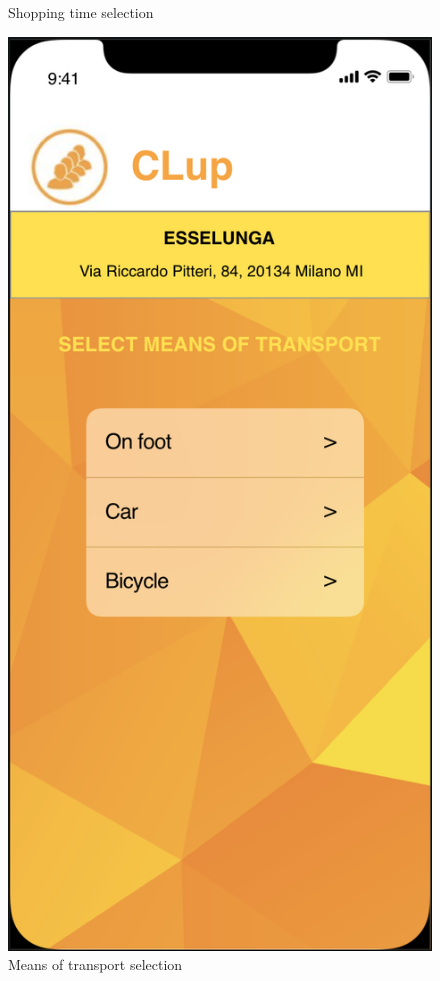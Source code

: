 \documentclass{article}
\begin{document}
\begin{figure}[H]
\begin{minipage}[b]{0.4\textwidth}
\caption{Shopping time selection}
\end{minipage}
\hfill
\begin{minipage}[b]{0.4\textwidth}
\centering
\includegraphics[width=\textwidth]{MeansofTransport.png}
\caption{Means of transport selection}
\end{minipage}
\end{figure}
\end{document}
